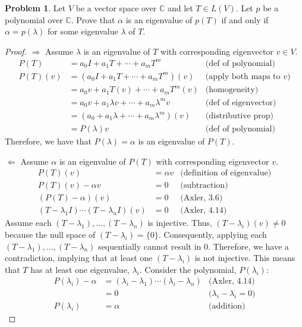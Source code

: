\documentclass[12pt,reqno]{article}
\theoremstyle{definition}
\newtheorem{problem}{Problem}
\begin{document}

\begin{problem}
    Let $V$ be a vector space over $\mathbb{C}$ and let $T \in L(V)$. Let $p$ be a polynomial over $\mathbb{C}$. Prove that $\alpha$ is an eigenvalue of $p(T)$ if and only if $\alpha = p(\lambda)$ for some eigenvalue $\lambda$ of $T$.
\end{problem}

\begin{proof}
    $\Rightarrow$ Assume $\lambda$ is an eigenvalue of $T$ with corresponding eigenvector $v\in V$.
    \begin{align*}
        P(T) &= a_0I + a_1T + \cdots + a_mT^m & \text{(def of polynomial)}\\
        P(T)(v) &= (a_0I + a_1T + \cdots + a_mT^m)(v) & \text{(apply both maps to $v$)}\\
        &= a_0v + a_1T(v) + \cdots + a_mT^m(v) & \text{(homogeneity)}\\
        &= a_0v + a_1\lambda v + \cdots + a_m\lambda^m v & \text{(def of eigenvector)}\\
        &= (a_0 + a_1\lambda + \cdots + a_m\lambda^m)(v) & \text{(distributive prop)}\\
        &= P(\lambda) v & \text{(def of polynomial)}
    \end{align*}
    Therefore, we have that $P(\lambda) = \alpha$ is an eigenvalue of $P(T)$.

    $\Leftarrow$ Assume $\alpha$ is an eigenvalue of $P(T)$ with corresponding eigenvector $v$.
    \begin{align*}
        P(T)(v) &= \alpha v & \text{(definition of eigenvalue)}\\
        P(T)(v) - \alpha v &= 0 &\text{(subtraction)}\\
        (P(T)-\alpha)(v) &= 0 & \text{(Axler, 3.6)}\\
        (T-\lambda_1 I)\cdots(T-\lambda_n I)(v) &= 0 & \text{(Axler, 4.14)}
    \end{align*}
    Assume each $(T - \lambda_1),\ldots,(T - \lambda_n)$ is injective. Thus, $(T - \lambda_i)(v)\neq 0$ because the null space of $(T - \lambda_i) = \{0\}$. Consequently, applying each $(T - \lambda_1),\ldots,(T - \lambda_n)$ sequentially cannot result in $0$. Therefore, we have a contradiction, implying that at least one $(T - \lambda_i)$ is not injective. This means that $T$ has at least one eigenvalue, $\lambda_i$. Consider the polynomial, $P(\lambda_i)$:
    \begin{align*}
        P(\lambda_i) - \alpha &= (\lambda_i - \lambda_1)\cdots(\lambda_i - \lambda_n) & \text{(Axler, 4.14)}\\
        &= 0 & \text{($\lambda_i - \lambda_i = 0$)}\\
        P(\lambda_i) &= \alpha & \text{(addition)}
    \end{align*}
\end{proof}
\end{document}
